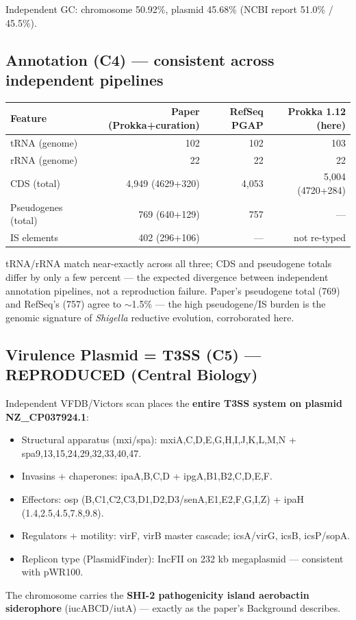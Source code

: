 \documentclass[11pt,letterpaper]{article}
\begin{document}
Independent GC: chromosome 50.92\%, plasmid 45.68\% (NCBI report 51.0\% / 45.5\%).

\subsection{Annotation (C4) --- consistent across independent pipelines}
\begin{longtable}{lrrr}
\toprule
Feature & Paper (Prokka+curation) & RefSeq PGAP & Prokka 1.12 (here) \\
\midrule
tRNA (genome) & 102 & 102 & 103 \\
rRNA (genome) & 22 & 22 & 22 \\
CDS (total) & 4{,}949 (4629+320) & 4{,}053 & 5{,}004 (4720+284) \\
Pseudogenes (total) & 769 (640+129) & 757 & --- \\
IS elements & 402 (296+106) & --- & not re-typed \\
\bottomrule
\end{longtable}

tRNA/rRNA match near-exactly across all three; CDS and pseudogene totals differ by only a few percent --- the expected divergence between independent annotation pipelines, not a reproduction failure. Paper's pseudogene total (769) and RefSeq's (757) agree to $\sim$1.5\% --- the high pseudogene/IS burden is the genomic signature of \textit{Shigella} reductive evolution, corroborated here.

\subsection{Virulence Plasmid = T3SS (C5) --- REPRODUCED (Central Biology)}
Independent VFDB/Victors scan places the \textbf{entire T3SS system on plasmid NZ\_CP037924.1}:
\begin{itemize}[nosep]
  \item Structural apparatus (mxi/spa): mxiA,C,D,E,G,H,I,J,K,L,M,N + spa9,13,15,24,29,32,33,40,47.
  \item Invasins + chaperones: ipaA,B,C,D + ipgA,B1,B2,C,D,E,F.
  \item Effectors: osp (B,C1,C2,C3,D1,D2,D3/senA,E1,E2,F,G,I,Z) + ipaH (1.4,2.5,4.5,7.8,9.8).
  \item Regulators + motility: virF, virB master cascade; icsA/virG, icsB, icsP/sopA.
  \item Replicon type (PlasmidFinder): IncFII on 232 kb megaplasmid --- consistent with pWR100.
\end{itemize}
The chromosome carries the \textbf{SHI-2 pathogenicity island aerobactin siderophore} (iucABCD/iutA) --- exactly as the paper's Background describes.
\end{document}
